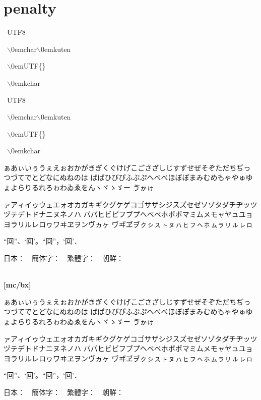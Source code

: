 \documentclass[a4paper,titlepage,draft\@landscape@]{\class}
\begin{document}
\section{penalty}
\edef\bs{$\backslash$\kern0em}

~UTF8

~\bs char\bs kuten

~\bs UTF\{\}

\ifuptexmode
{}~\bs kchar
\fi


~UTF8

~\bs char\bs kuten

~\bs UTF\{\}

\ifuptexmode
{}~\bs kchar
\fi


\clearpage
[mc/m]

ぁあぃいぅうぇえぉおかがきぎくぐけげこごさざしじすずせぜそぞただちぢっつづてでとどなにぬねのは
ばぱひびぴふぶぷへべぺほぼぽまみむめもゃやゅゆょよらりるれろゎわゐゑをんヽヾゝゞー
\ifuptexmode
ゔゕゖ
\fi

ァアィイゥウェエォオカガキギクグケゲコゴサザシジスズセゼソゾタダチヂッツヅテデトドナニヌネノハ
バパヒビピフブプヘベペホボポマミムメモャヤュユョヨラリルレロヮワヰヱヲンヴヵヶ
\ifuptexmode
ヷヸヹヺㇰㇱㇲㇳㇴㇵㇶㇷㇸㇹㇺㇻㇼㇽㇾㇿ
\fi

“回”、‘回’。“回”，‘回’．

日本：~~簡体字：~~繁體字：~~朝鮮：\\
~~%
~~%

{\bfseries%
[mc/bx]

ぁあぃいぅうぇえぉおかがきぎくぐけげこごさざしじすずせぜそぞただちぢっつづてでとどなにぬねのは
ばぱひびぴふぶぷへべぺほぼぽまみむめもゃやゅゆょよらりるれろゎわゐゑをんヽヾゝゞー
\ifuptexmode
ゔゕゖ
\fi

ァアィイゥウェエォオカガキギクグケゲコゴサザシジスズセゼソゾタダチヂッツヅテデトドナニヌネノハ
バパヒビピフブプヘベペホボポマミムメモャヤュユョヨラリルレロヮワヰヱヲンヴヵヶ
\ifuptexmode
ヷヸヹヺㇰㇱㇲㇳㇴㇵㇶㇷㇸㇹㇺㇻㇼㇽㇾㇿ
\fi

“回”、‘回’。“回”，‘回’．

日本：~~簡体字：~~繁體字：~~朝鮮：\\
~~%
~~%
}
\end{document}
